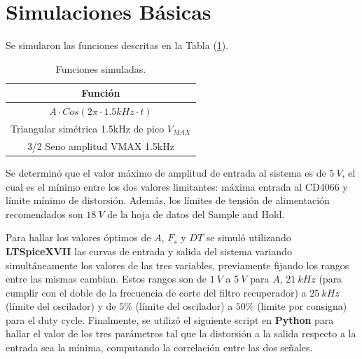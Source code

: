 


\section{Simulaciones Básicas}

Se simularon las funciones descritas en la Tabla (\ref{fn}).
\begin{table}[H]
\centering
\begin{tabular}{@{}c@{}}
\toprule
Función \\ \midrule
$A\cdot Cos(2\pi \cdot 1.5kHz \cdot t)$ \\
Triangular simétrica 1.5kHz de pico $V_{MAX}$ \\
3/2 Seno amplitud VMAX 1.5kHz \\ \bottomrule
\end{tabular}
\caption{Funciones simuladas.}
\label{fn}
\end{table}

Se determinó que el valor máximo de amplitud de entrada al sistema es de $5 \ V$, el cual es el mínimo entre los dos valores limitantes: máxima entrada al CD4066 y límite mínimo de distorsión. Además, los límites de tensión de alimentación recomendados son $18 \ V$ de la hoja de datos del Sample and Hold.

Para hallar los valores óptimos de $A$, $F_s$ y $DT$ se simuló utilizando \textbf{LTSpiceXVII} las curvas de entrada y salida del sistema variando simultáneamente los valores de las tres variables, previamente fijando los rangos entre las mismas cambian. Estos rangos son de $1 \ V$ a $5 \ V$ para $A$, $21 \ kHz$ (para cumplir con el doble de la frecuencia de corte del filtro recuperador) a $25 \ kHz$ (límite del oscilador) y de $5\%$ (límite del oscilador) a $50\%$ (limite por consigna) para el duty cycle. Finalmente, se utilizó el siguiente script en \textbf{Python} para hallar el valor de los tres parámetros tal que la distorsión a la salida respecto a la entrada sea la mínima, computando la correlación entre las dos señales.
\begin{figure}[H]
\centering
\scalebox{0.75}{
}
\end{figure}

